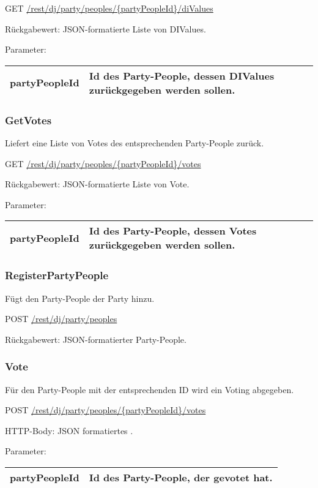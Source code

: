 GET
\url{/rest/dj/party/peoples/{partyPeopleId}/diValues}

Rückgabewert: JSON-formatierte Liste von DIValues.

Parameter:\\
\begin{tabularx}{\textwidth}{|l|X|}
\hline partyPeopleId & Id des Party-People, dessen DIValues zurückgegeben werden sollen. \\ 
\hline 
\end{tabularx}

\subsubsection{GetVotes}
\label{service:GetVotes}
Liefert eine Liste von Votes des entsprechenden Party-People zurück.

GET
\url{/rest/dj/party/peoples/{partyPeopleId}/votes}

Rückgabewert: JSON-formatierte Liste von Vote.

Parameter:\\
\begin{tabularx}{\textwidth}{|l|X|}
\hline partyPeopleId & Id des Party-People, dessen Votes zurückgegeben werden sollen. \\ 
\hline 
\end{tabularx}

\subsubsection{RegisterPartyPeople}
\label{service:RegisterPartyPeople}
Fügt den Party-People der Party hinzu.

POST
\url{/rest/dj/party/peoples}

Rückgabewert: JSON-formatierter Party-People.

\subsubsection{Vote}
\label{service:Vote}
Für den Party-People mit der entsprechenden ID wird ein Voting abgegeben.

POST
\url{/rest/dj/party/peoples/{partyPeopleId}/votes}

HTTP-Body: JSON formatiertes .

Parameter:\\
\begin{tabularx}{\textwidth}{|l|X|}
\hline partyPeopleId & Id des Party-People, der gevotet hat. \\ 
\hline 
\end{tabularx}

